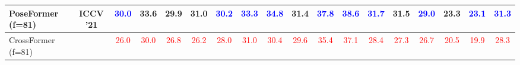 \documentclass[runningheads]{llncs}
\begin{document}
\begin{table}
{\begin{tabular}{l|c|ccccccccccccccc|c}
PoseFormer \cite{poseformer} (f=81)& ICCV \textquoteright 21 & \textcolor{blue}{30.0}  & 33.6  & 29.9  & 31.0 & \textcolor{blue}{30.2}  & \textcolor{blue}{33.3}  & \textcolor{blue}{34.8}  & 31.4  & \textcolor{blue}{37.8} & \textcolor{blue}{38.6}  & \textcolor{blue}{31.7}  & 31.5  & \textcolor{blue}{29.0}  & 23.3  & \textcolor{blue}{23.1}  & \textcolor{blue}{31.3}\tabularnewline



\hline 
 CrossFormer (f=81)&  & \textcolor{red}{26.0}  &  \textcolor{red}{ 30.0} &\textcolor{red}{ 26.8}  &\textcolor{red}{ 26.2}  &\textcolor{red}{ 28.0}  & \textcolor{red}{ 31.0} &\textcolor{red}{ 30.4}  &\textcolor{red}{ 29.6}  & \textcolor{red}{ 35.4} & \textcolor{red}{ 37.1} &\textcolor{red}{ 28.4}  &\textcolor{red}{ 27.3}  &\textcolor{red}{ 26.7}  &\textcolor{red}{ 20.5}  &\textcolor{red}{ 19.9}  & \textcolor{red}{ 28.3}\tabularnewline
\hline 
\end{tabular}
}
\label{table:gt_h36}
\end{table}
\vspace{-2em}
\end{document}
